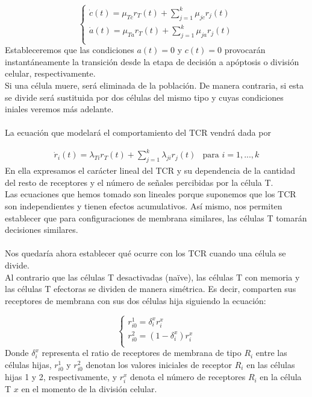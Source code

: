 \documentclass{article}
\begin{document}
	 \begin{displaymath}
         \left\{ \begin{array}{l}
        \dot{c}(t) = \mu_{Tc}r_{T}(t) + \sum_{j=1}^{k}\mu_{jc}r_{j}(t)\\
        \dot{a}(t) = \mu_{Ta}r_{T}(t) + \sum_{j=1}^{k}\mu_{ja}r_{j}(t) \\
        \end{array}
        \right.
    \end{displaymath}
    Estableceremos que las condiciones $a(t)=0$ y $c(t)=0$ provocarán instantáneamente la transición desde la etapa de decisión a apóptosis o división celular, respectivamente.
	\\
	Si una célula muere, será eliminada de la población. De manera contraria, si esta se divide será sustituida por dos células del mismo tipo y cuyas condiciones iniales veremos más adelante.
	\\
	\\
	La ecuación que modelará el comportamiento del TCR vendrá dada por 

	\begin{displaymath}
        \begin{array}{ll}
        \dot{r}_{i}(t) = \lambda_{Ti}r_{T}(t) + \sum_{j=1}^{k}\lambda_{ji}r_{j}(t) & \mbox{para $i=1,...,k$} 
        \end{array}
    \end{displaymath}
	En ella expresamos el carácter lineal del TCR y su dependencia de la cantidad del resto de receptores y el número de señales percibidas por la célula T. 
	\\
	Las ecuaciones que hemos tomado son lineales porque suponemos que los TCR son independientes y tienen efectos acumulativos. Así mismo, nos permiten establecer que para configuraciones de membrana similares, las células T tomarán decisiones similares.
	\\
	\\
	Nos quedaría ahora establecer qué ocurre con los TCR cuando una célula se divide. 
	\\
	Al contrario que las células T desactivadas (naïve), las células T con memoria y las células T efectoras se dividen de manera simétrica. Es decir, comparten sus receptores de membrana con sus dos células hija siguiendo la ecuación:
	
	\begin{displaymath}
         \left\{ \begin{array}{l}
        r_{i0}^{1}= \delta_{i}^{x} r_{i}^{x}\\
        r_{i0}^{2}= (1-\delta_{i}^{x}) r_{i}^{x} \\
        \end{array}
        \right.
    \end{displaymath}
	Donde $\delta_{i}^{x}$ representa el ratio de receptores de membrana de tipo $R_{i}$ entre las células hijas, $r_{i0}^{1}$ y $r_{i0}^{2}$ denotan los valores iniciales de receptor $R_{i}$ en las células hijas 1 y 2, respectivamente, y  $r_{i}^{x}$ denota el número de receptores $R_{i}$ en la célula T $x$ en el momento de la división celular.
	
\end{document}
